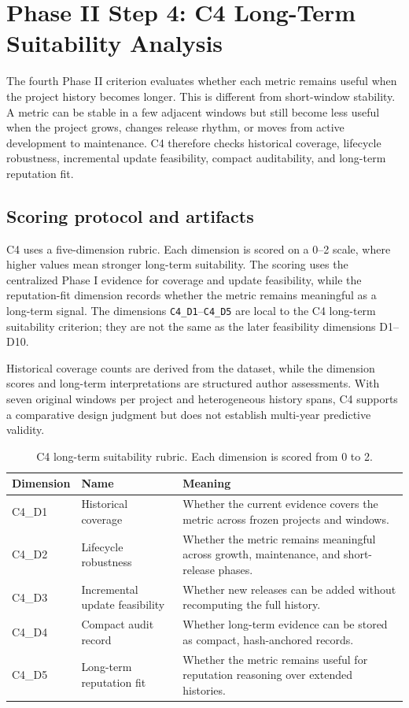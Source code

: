 \section{Phase II Step 4: C4 Long-Term Suitability Analysis}
\label{sec:phase2_c4_longterm_suitability}

The fourth Phase II criterion evaluates whether each metric remains useful when the project history becomes longer.
This is different from short-window stability. A metric can be stable in a few adjacent windows but still become
less useful when the project grows, changes release rhythm, or moves from active development to maintenance.
C4 therefore checks historical coverage, lifecycle robustness, incremental update feasibility, compact auditability,
and long-term reputation fit.

\subsection{Scoring protocol and artifacts}
\label{sec:c4_protocol_artifacts}

C4 uses a five-dimension rubric. Each dimension is scored on a 0--2 scale, where higher values mean stronger
long-term suitability. The scoring uses the centralized Phase I evidence for coverage and update feasibility,
while the reputation-fit dimension records whether the metric remains meaningful as a long-term signal. The
dimensions \texttt{C4\_D1}--\texttt{C4\_D5} are local to the C4 long-term suitability criterion; they are not
the same as the later feasibility dimensions D1--D10.

Historical coverage counts are derived from the dataset, while the dimension scores and long-term interpretations are
structured author assessments. With seven original windows per project and heterogeneous history spans, C4 supports a
comparative design judgment but does not establish multi-year predictive validity.

\begin{table}[H]
\centering
\scriptsize
\renewcommand{\arraystretch}{1.08}
\begin{tabularx}{\textwidth}{p{2.1cm}p{3.8cm}X}
\toprule
\textbf{Dimension} & \textbf{Name} & \textbf{Meaning} \\
\midrule
C4\_D1 & Historical coverage & Whether the current evidence covers the metric across frozen projects and windows. \\
C4\_D2 & Lifecycle robustness & Whether the metric remains meaningful across growth, maintenance, and short-release phases. \\
C4\_D3 & Incremental update feasibility & Whether new releases can be added without recomputing the full history. \\
C4\_D4 & Compact audit record & Whether long-term evidence can be stored as compact, hash-anchored records. \\
C4\_D5 & Long-term reputation fit & Whether the metric remains useful for reputation reasoning over extended histories. \\
\bottomrule
\end{tabularx}
\caption{C4 long-term suitability rubric. Each dimension is scored from 0 to 2.}
\label{tab:c4_rubric}
\end{table}

